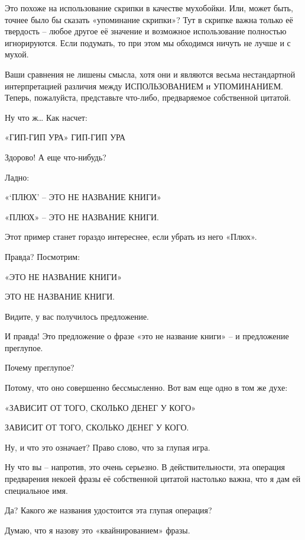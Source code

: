 \documentclass[../main.tex]{subfiles}
\begin{document}
\begin{Dialogue}
 Это похоже на использование скрипки в качестве мухобойки. Или, может быть, точнее было бы сказать «упоминание скрипки»? Тут в скрипке важна только её твердость \--- любое другое её значение и возможное использование полностью игнорируются. Если подумать, то при этом мы обходимся ничуть не лучше и с мухой.

 Ваши сравнения не лишены смысла, хотя они и являются весьма нестандартной интерпретацией различия между ИСПОЛЬЗОВАНИЕМ и УПОМИНАНИЕМ. Теперь, пожалуйста, представьте что-либо, предваряемое собственной цитатой.

 Ну что ж\ldots{} Как насчет:

«ГИП-ГИП УРА» ГИП-ГИП УРА

 Здорово! А еще что-нибудь?

 Ладно:

«\enquote*{ПЛЮХ} \--- ЭТО НЕ НАЗВАНИЕ КНИГИ»

«ПЛЮХ» \--- ЭТО НЕ НАЗВАНИЕ КНИГИ.

 Этот пример станет гораздо интереснее, если убрать из него «Плюх».

 Правда? Посмотрим:

«ЭТО НЕ НАЗВАНИЕ КНИГИ»

ЭТО НЕ НАЗВАНИЕ КНИГИ.

 Видите, у вас получилось предложение.

 И правда! Это предложение о фразе «это не название книги» \--- и предложение преглупое.

 Почему преглупое?

 Потому, что оно совершенно бессмысленно. Вот вам еще одно в том же духе:

«ЗАВИСИТ ОТ ТОГО, СКОЛЬКО ДЕНЕГ У КОГО»

ЗАВИСИТ ОТ ТОГО, СКОЛЬКО ДЕНЕГ У КОГО.

Ну, и что это означает? Право слово, что за глупая игра.

 Ну что вы \--- напротив, это очень серьезно. В действительности, эта операция предварения некоей фразы её собственной цитатой настолько важна, что я дам ей специальное имя.

 Да? Какого же названия удостоится эта глупая операция?

 Думаю, что я назову это «квайнированием» фразы.


\end{Dialogue}
\end{document}
